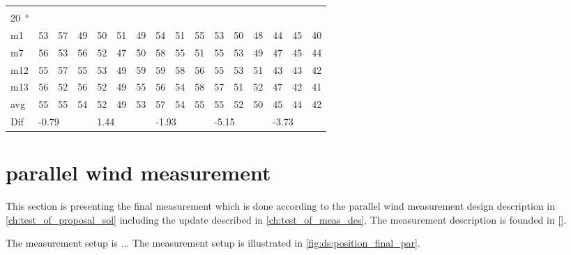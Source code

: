 \begin{table}[H]
\begin{tabular}{l|l|l|l|l|l|l|l|l|l|l|l|l|lll}
 \multicolumn{16}{l}{ } \\                             
\SI{20}{\degree}   & \multicolumn{3}{l|}{} & \multicolumn{3}{l|}{} & \multicolumn{3}{l|}{} & \multicolumn{3}{l|}{} & \multicolumn{3}{l}{}   \\  \hline
m1    &53      &  57    &  49    &   50   &  51    &  49    &  54    &   51    &  55    &    53   &  50    &  48    & \multicolumn{1}{l|}{44} & \multicolumn{1}{l|}{45} &40  \\
m7    & 56     &  53    &  56    &   52   &  47    &   50   &   58   &   55    &  51    &    55   & 53     &  49    & \multicolumn{1}{l|}{47} & \multicolumn{1}{l|}{45} &44  \\
m12  & 55     &  57    &  55    &  53    &  49    &   59   &   59   &   58    &   56   &   55    &  53    & 51     & \multicolumn{1}{l|}{43} & \multicolumn{1}{l|}{43} & 42 \\
m13  &  56    &  52    &  56    &  52    &  49    &   55   &   56   &   54    &  58    &   57    &  51    &  52    & \multicolumn{1}{l|}{47} & \multicolumn{1}{l|}{42} & 41 \\ \hline
avg &  55    & 55     &   54   &  52    & 49     &  53    &  57    &  54     &  55    &  55     &   52   & 50     & \multicolumn{1}{l|}{45} & \multicolumn{1}{l|}{44}  &42  \\ \hline  
Dif & \multicolumn{3}{l|}{-0.79} & \multicolumn{3}{l|}{1.44} & \multicolumn{3}{l|}{-1.93} & \multicolumn{3}{l|}{-5.15} & \multicolumn{3}{l}{-3.73}                              
\end{tabular}
\end{table}

\newpage
\section{parallel wind measurement}\label{mes:kudo:par_mes}
This section is presenting the final measurement which is done according to the parallel wind measurement design description in \autoref{ch:test_of_proposal_sol} including the update described in \autoref{ch:test_of_meas_des}. The measurement description is founded in \autoref{}. 


The measurement setup is ... The measurement setup is illustrated in \autoref{fig:ds:position_final_par}.






